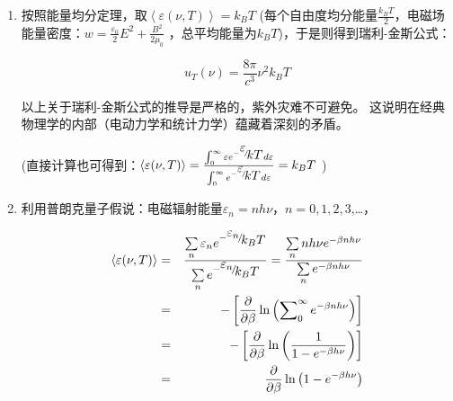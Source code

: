 \begin{enumerate}
    \item 按照能量均分定理，取$\left\langle {\varepsilon (\nu ,T)} \right\rangle  = k_B T$
(每个自由度均分能量$\frac{{k_B T}}{2}$，电磁场能量密度：$w = \frac{{\varepsilon _0 }}{2}E^2  + \frac{{B^2 }}{{2\mu _0 }}$ ，总平均能量为$k_B T$)，于是则得到瑞利-金斯公式：

\begin{equation}\label{rayleigh}
    u_T (\nu ) = \frac{{8\pi }}{{c^3 }}\nu ^2 k_B T
\end{equation}

以上关于瑞利-金斯公式的推导是严格的，紫外灾难不可避免。
这说明在经典物理学的内部（电动力学和统计力学）蕴藏着深刻的矛盾。

(直接计算也可得到：$\left\langle {\varepsilon (\nu ,T)} \right\rangle  = \frac{{\int_0^\infty  {\varepsilon e^{ - {\raise0.7ex\hbox{$\varepsilon $} \!\mathord{\left/
 {\vphantom {\varepsilon  {kT}}}\right.\kern-\nulldelimiterspace}
\!\lower0.7ex\hbox{${kT}$}}} } d\varepsilon }}{{\int_0^\infty  {e^{ - {\raise0.7ex\hbox{$\varepsilon $} \!\mathord{\left/
 {\vphantom {\varepsilon  {kT}}}\right.\kern-\nulldelimiterspace}
\!\lower0.7ex\hbox{${kT}$}}} d\varepsilon } }} = k_B T$
)

\item 利用普朗克量子假说：电磁辐射能量$\varepsilon_n = n h \nu$，$n=0,1,2,3$,…，

\begin{eqnarray*}
\left\langle {\varepsilon (\nu ,T)} \right\rangle &=& \frac{{\sum\limits_n {\varepsilon _n e^{ - {\raise0.7ex\hbox{${\varepsilon _n }$} \!\mathord{\left/
 {\vphantom {{\varepsilon _n } {k_B T}}}\right.\kern-\nulldelimiterspace}
\!\lower0.7ex\hbox{${k_B T}$}}} } }}{{\sum\limits_n {e^{ - {\raise0.7ex\hbox{${\varepsilon _n }$} \!\mathord{\left/
 {\vphantom {{\varepsilon _n } {k_B T}}}\right.\kern-\nulldelimiterspace}
\!\lower0.7ex\hbox{${ k_B T}$}}} } }} = \frac{{\sum\limits_n {nh\nu e^{
- \beta nh\nu } } }}{{\sum\limits_n {e^{ - \beta nh\nu } } }} \\
{} &=& - \left[ {\frac{\partial }{{\partial \beta }}\ln \left( {\sum\nolimits_0^\infty  {e^{ - \beta nh\nu } } } \right)} \right] \\
{} &=& - \left[ {\frac{\partial }{{\partial \beta }}\ln \left( {\frac{1}{{1 - e^{ - \beta h\nu } }}} \right)} \right] \\
{} &= & \frac{\partial
}{{\partial \beta }}\ln \left( {1 - e^{ - \beta h\nu } } \right)
\end{eqnarray*}


\end{enumerate}
